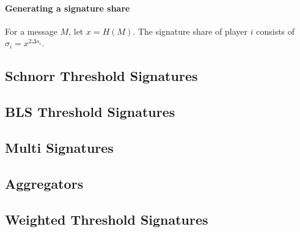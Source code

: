 \paragraph{Generating a signature share} For a message $M$, let $x=H(M)$. The signature share of player $i$ consists of $\sigma_i = x^{2 \Delta s_i}$. 


\subsection{Schnorr Threshold Signatures}

\subsection{BLS Threshold Signatures}

\subsection{Multi Signatures}

\subsection{Aggregators}

\subsection{Weighted Threshold Signatures}